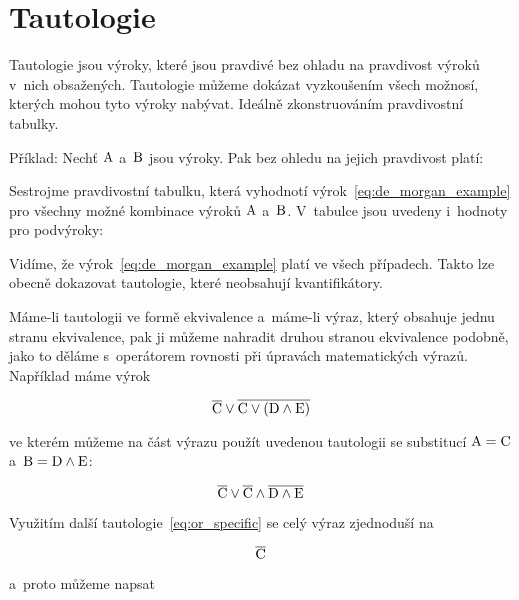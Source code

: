 \section{Tautologie}

Tautologie jsou výroky, které jsou pravdivé bez ohladu na pravdivost výroků v~nich obsažených. Tautologie můžeme dokázat vyzkoušením všech možnosí, kterých mohou tyto výroky nabývat. Ideálně zkonstruováním pravdivostní tabulky.

Příklad: Nechť \(\mathrm{A}\) a~\(\mathrm{B}\) jsou výroky. Pak bez ohledu na jejich pravdivost platí:


Sestrojme pravdivostní tabulku, která vyhodnotí výrok~\eqref{eq:de_morgan_example} pro všechny možné kombinace výroků \(\mathrm{A}\) a~\(\mathrm{B}\). V~tabulce jsou uvedeny i~hodnoty pro podvýroky:


Vidíme, že výrok~\eqref{eq:de_morgan_example} platí ve všech případech. Takto lze obecně dokazovat tautologie, které neobsahují kvantifikátory.

Máme-li tautologii ve formě ekvivalence a~máme-li výraz, který obsahuje jednu stranu ekvivalence, pak ji můžeme nahradit druhou stranou ekvivalence podobně, jako to děláme s~operátorem rovnosti při úpravách matematických výrazů. Například máme výrok

\begin{equation}
\overline{\mathrm{C}} \lor \overline{\mathrm{C} \lor (\mathrm{D} \land \mathrm{E})}
\end{equation}

ve kterém můžeme na část výrazu použít uvedenou tautologii se substitucí \(\mathrm{A} = \mathrm{C}\) a~\(\mathrm{B} = \mathrm{D} \land \mathrm{E}\):

\begin{equation}
\overline{\mathrm{C}} \lor \overline{\mathrm{C}} \land \overline{\mathrm{D} \land \mathrm{E}}
\end{equation}

Využitím další tautologie~\eqref{eq:or_specific} se celý výraz zjednoduší na

\begin{equation}
\overline{\mathrm{C}}
\end{equation}

a~proto můžeme napsat



